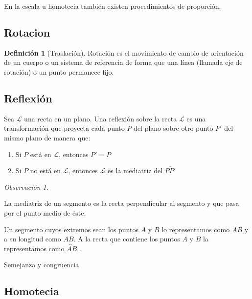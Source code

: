 \documentclass[16pt,]{krantz}
\theoremstyle{definition}
\newtheorem{definition}{Definición}[chapter]
\theoremstyle{definition}
\theoremstyle{definition}
\theoremstyle{definition}
\theoremstyle{remark}
\newtheorem*{remark}{Observación}
\begin{document}
En la escala u homotecia también existen procedimientos de proporción.

\hypertarget{rotacion}{%
\subsection{Rotacion}\label{rotacion}}

\begin{definition}[Traslación]
\protect\hypertarget{def:rotacion}{}{\label{def:rotacion} {} }Rotación es el movimiento de cambio de orientación de un cuerpo o un sistema de referencia de forma que una línea (llamada eje de rotación) o un punto permanece fijo.
\end{definition}

\hypertarget{reflexiuxf3n}{%
\subsection{Reflexión}\label{reflexiuxf3n}}

Sea \(\mathcal{L}\) una recta en un plano. Una reflexión sobre la recta \(\mathcal{L}\) es una transformación que proyecta cada punto \(P\) del plano sobre otro punto \(P'\) del mismo plano de manera que:

\begin{enumerate}
\def\labelenumi{\arabic{enumi}.}
\item
  Si \(P\) está en \(\mathcal{L}\), entonces \(P'=P\)
\item
  Si \(P\) no está en \(\mathcal{L}\), entonces \(\mathcal{L}\) es la mediatriz del \(\overline{PP'}\)
\end{enumerate}

\begin{remark}
{}
\end{remark}

La mediatriz de un segmento es la recta perpendicular al segmento y que pasa por el punto medio de éste.

Un segmento cuyos extremos sean los puntos \(A\) y \(B\) lo representamos como \(\overline{AB}\) y a su longitud como \(AB\). A la recta que contiene los puntos \(A\) y \(B\) la representamos como \(\overleftrightarrow{AB}\) .

Semejanza y congruencia

\hypertarget{homotecia}{%
\subsection{Homotecia}\label{homotecia}}
\end{document}
